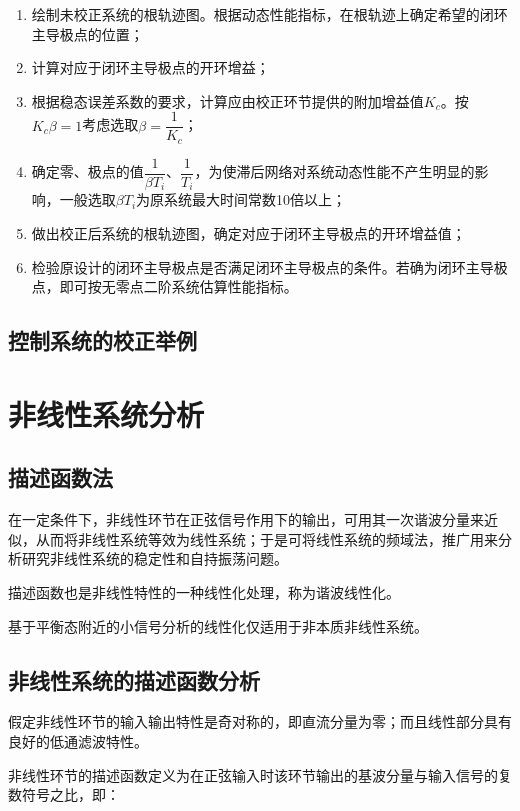 \documentclass[cn, blue, normal, 12pt]{elegantnote}
\begin{document}
\begin{enumerate}
    \setlength{\itemsep}{6pt}
    \item 绘制未校正系统的根轨迹图。根据动态性能指标，在根轨迹上确定希望的闭环主导极点的位置；
    \item 计算对应于闭环主导极点的开环增益；
    \item 根据稳态误差系数的要求，计算应由校正环节提供的附加增益值$K_c$。按$K_c\beta=1$考虑选取$\beta=\dfrac{1}{K_c}$；
    \item 确定零、极点的值$\dfrac{1}{\beta T_i}$、$\dfrac{1}{T_i}$，为使滞后网络对系统动态性能不产生明显的影响，一般选取$\beta T_i$为原系统最大时间常数10倍以上；
    \item 做出校正后系统的根轨迹图，确定对应于闭环主导极点的开环增益值；
    \item 检验原设计的闭环主导极点是否满足闭环主导极点的条件。若确为闭环主导极点，即可按无零点二阶系统估算性能指标。
\end{enumerate}

\subsection{控制系统的校正举例}



\section{非线性系统分析}

\subsection{描述函数法}

在一定条件下，非线性环节在正弦信号作用下的输出，可用其一次谐波分量来近似，从而将非线性系统等效为线性系统；于是可将线性系统的频域法，推广用来分析研究非线性系统的稳定性和自持振荡问题。

描述函数也是非线性特性的一种线性化处理，称为谐波线性化。

基于平衡态附近的小信号分析的线性化仅适用于非本质非线性系统。

\subsection{非线性系统的描述函数分析}

假定非线性环节的输入输出特性是奇对称的，即直流分量为零；而且线性部分具有良好的低通滤波特性。

非线性环节的描述函数定义为在正弦输入时该环节输出的基波分量与输入信号的复数符号之比，即：
\end{document}
